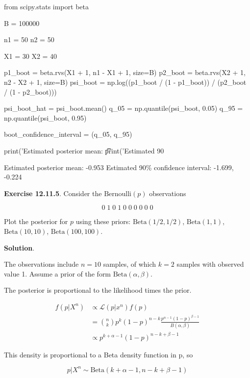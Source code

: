 \begin{python}
from scipy.stats import beta

B = 100000

n1 = 50
n2 = 50

X1 = 30
X2 = 40

p1_boot = beta.rvs(X1 + 1, n1 - X1 + 1, size=B)
p2_boot = beta.rvs(X2 + 1, n2 - X2 + 1, size=B)
psi_boot = np.log((p1_boot / (1 - p1_boot)) / (p2_boot / (1 - p2_boot)))

psi_boot_hat = psi_boot.mean()
q_05 = np.quantile(psi_boot, 0.05)
q_95 = np.quantile(psi_boot, 0.95)

boot_confidence_interval = (q_05, q_95)

print('Estimated posterior mean: \t\t %
print('Estimated 90%
\end{python}

\begin{console}
Estimated posterior mean:                -0.953
Estimated 90\% confidence interval:       -1.699, -0.224
\end{console}

\textbf{Exercise 12.11.5}. Consider the \(\text{Bernoulli}(p)\)
observations

\[ 0\; 1\; 0\; 1\; 0\; 0\; 0\; 0\; 0\; 0 \]

Plot the posterior for \(p\) using these priors:
\(\text{Beta}(1/2, 1/2)\), \(\text{Beta}(1, 1)\),
\(\text{Beta}(10, 10)\), \(\text{Beta}(100, 100)\).

\textbf{Solution}.

The observations include \(n = 10\) samples, of which \(k = 2\) samples
with observed value 1. Assume a prior of the form
\(\text{Beta}(\alpha, \beta)\).

The posterior is proportional to the likelihood times the prior.

\begin{align}
f(p | X^n) & \propto \mathcal{L}(p | x^n) f(p) \\
&= \binom{n}{k} p^k (1 - p)^{n-k} \frac{p^{\alpha - 1}(1-p)^{\beta - 1}}{B(\alpha, \beta)}\\
&\propto p^{k + \alpha - 1} (1 - p)^{n - k + \beta - 1}
\end{align}

This density is proportional to a Beta density function in p, so

\[p | X^n \sim \text{Beta}(k + \alpha - 1, n - k + \beta - 1)\]

